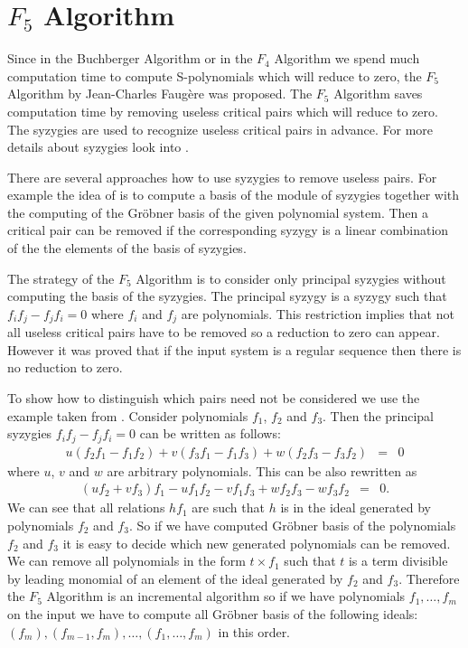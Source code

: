 

\section{$F_5$ Algorithm}
Since in the Buchberger Algorithm or in the $F_4$ Algorithm we spend much computation time to compute S-polynomials which will reduce to zero, the $F_5$ Algorithm \cite{F5} by Jean-Charles Faug\`ere was proposed. The $F_5$ Algorithm saves computation time by removing useless critical pairs which will reduce to zero. The syzygies are used to recognize useless critical pairs in advance. For more details about syzygies look into \cite{Cox-Little-Shea97}.

There are several approaches how to use syzygies to remove useless pairs. For example the idea of \cite{GBSyzygies} is to compute a basis of the module of syzygies together with the computing of the Gr\"obner basis of the given polynomial system. Then a critical pair can be removed if the corresponding syzygy is a linear combination of the the elements of the basis of syzygies.

The strategy of the $F_5$ Algorithm is to consider only principal syzygies without computing the basis of the syzygies. The principal syzygy is a syzygy such that $f_if_j - f_jf_i = 0$ where $f_i$ and $f_j$ are polynomials. This restriction implies that not all useless critical pairs have to be removed so a reduction to zero can appear. However it was proved that if the input system is a regular sequence then there is no reduction to zero.

To show how to distinguish which pairs need not be considered we use the example taken from \cite{F5}. Consider polynomials $f_1$, $f_2$ and $f_3$. Then the principal syzygies $f_if_j - f_jf_i = 0$ can be written as follows:
\begin{eqnarray}
  u(f_2f_1 - f_1f_2) + v(f_3f_1 - f_1f_3) + w(f_2f_3 - f_3f_2) &=& 0
\end{eqnarray}
where $u$, $v$ and $w$ are arbitrary polynomials. This can be also rewritten as
\begin{eqnarray}
  (uf_2 + vf_3)f_1 - uf_1f_2 - vf_1f_3 + wf_2f_3 - wf_3f_2 &=& 0.
\end{eqnarray}
We can see that all relations $hf_1$ are such that $h$ is in the ideal generated by polynomials $f_2$ and $f_3$. So if we have computed Gr\"obner basis of the polynomials $f_2$ and $f_3$ it is easy to decide which new generated polynomials can be removed. We can remove all polynomials in the form $t\times f_1$ such that $t$ is a term divisible by leading monomial of an element of the ideal generated by $f_2$ and $f_3$. Therefore the $F_5$ Algorithm is an incremental algorithm so if we have polynomials $f_1, \dots, f_m$ on the input we have to compute all Gr\"obner basis of the following ideals: $(f_m), (f_{m-1}, f_m), \dots, (f_1, \dots, f_m)$ in this order.

